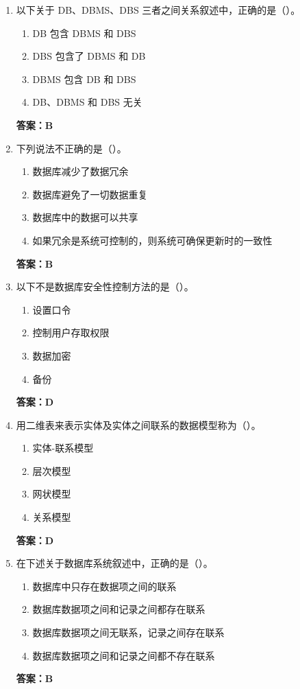 \documentclass[12pt, a4paper]{article}
\begin{document}
\begin{enumerate}[label=\arabic*.]
	\item 以下关于 DB、DBMS、DBS 三者之间关系叙述中，正确的是（\quad）。
	      \begin{enumerate}
		      \item DB 包含 DBMS 和 DBS
		      \item DBS 包含了 DBMS 和 DB
		      \item DBMS 包含 DB 和 DBS
		      \item DB、DBMS 和 DBS 无关
	      \end{enumerate}
	      \textbf{答案：B}

	\item 下列说法不正确的是（\quad）。
	      \begin{enumerate}
		      \item 数据库减少了数据冗余
		      \item 数据库避免了一切数据重复
		      \item 数据库中的数据可以共享
		      \item 如果冗余是系统可控制的，则系统可确保更新时的一致性
	      \end{enumerate}
	      \textbf{答案：B}

	\item 以下不是数据库安全性控制方法的是（\quad）。
	      \begin{enumerate}
		      \item 设置口令
		      \item 控制用户存取权限
		      \item 数据加密
		      \item 备份
	      \end{enumerate}
	      \textbf{答案：D}

	\item 用二维表来表示实体及实体之间联系的数据模型称为（\quad）。
	      \begin{enumerate}
		      \item 实体-联系模型
		      \item 层次模型
		      \item 网状模型
		      \item 关系模型
	      \end{enumerate}
	      \textbf{答案：D}

	\item 在下述关于数据库系统叙述中，正确的是（\quad）。
	      \begin{enumerate}
		      \item 数据库中只存在数据项之间的联系
		      \item 数据库数据项之间和记录之间都存在联系
		      \item 数据库数据项之间无联系，记录之间存在联系
		      \item 数据库数据项之间和记录之间都不存在联系
	      \end{enumerate}
	      \textbf{答案：B}


\end{enumerate}
\end{document}
